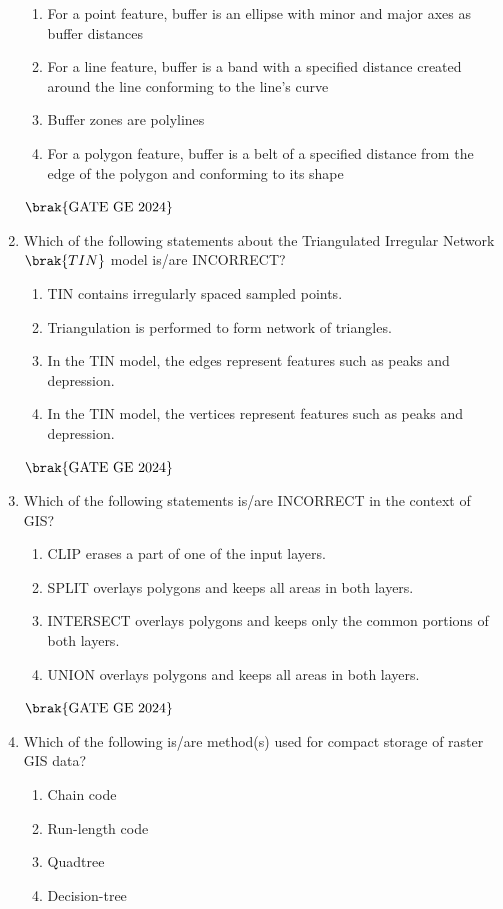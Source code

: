 \documentclass[journal,12pt,onecolumn]{IEEEtran}
\theoremstyle{remark}
\begin{document}
\begin{enumerate}
\begin{enumerate}
\item For a point feature, buffer is an ellipse with minor and major axes as buffer distances
\item For a line feature, buffer is a band with a specified distance created around the line conforming to the line's curve
\item Buffer zones are polylines
\item For a polygon feature, buffer is a belt of a specified distance from the edge of the polygon and conforming to its shape
\end{enumerate}
\hfill $\brak{\text{GATE GE 2024}}$
\bigskip
\item Which of the following statements about the Triangulated Irregular Network $\brak{TIN}$ model is/are INCORRECT?
\begin{enumerate}
\item TIN contains irregularly spaced sampled points.
\item Triangulation is performed to form network of triangles.
\item In the TIN model, the edges represent features such as peaks and depression.
\item In the TIN model, the vertices represent features such as peaks and depression.
\end{enumerate}
\hfill $\brak{\text{GATE GE 2024}}$
\bigskip
\item Which of the following statements is/are INCORRECT in the context of GIS?
\begin{enumerate}
\item CLIP erases a part of one of the input layers.
\item SPLIT overlays polygons and keeps all areas in both layers.
\item INTERSECT overlays polygons and keeps only the common portions of both layers.
\item UNION overlays polygons and keeps all areas in both layers.
\end{enumerate}
\hfill $\brak{\text{GATE GE 2024}}$
\bigskip
\item Which of the following is/are method(s) used for compact storage of raster GIS data?
\begin{enumerate}
\item Chain code
\item Run-length code
\item Quadtree
\item Decision-tree
\end{enumerate}

\end{enumerate}
\end{document}
